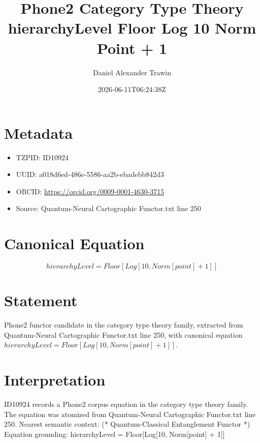 \documentclass[11pt]{article}
\title{Phone2 Category Type Theory hierarchyLevel Floor Log 10 Norm Point + 1}
\author{Daniel Alexander Trawin}
\date{2026-06-11T06:24:38Z}
\begin{document}
\maketitle
\section*{Metadata}
\begin{itemize}
\item TZPID: ID10924
\item UUID: a018d6ed-486e-5586-aa2b-ebadebb842d3
\item ORCID: \url{https://orcid.org/0009-0001-4630-3715}
\item Source: Quantum-Neural Cartographic Functor.txt line 250
\end{itemize}
\section*{Canonical Equation}
\[
hierarchyLevel = Floor[Log[10, Norm[point] + 1]]
\]
\section*{Statement}
Phone2 functor candidate in the category type theory family, extracted from Quantum-Neural Cartographic Functor.txt line 250, with canonical equation $hierarchyLevel = Floor[Log[10, Norm[point] + 1]]$.
\section*{Interpretation}
ID10924 records a Phone2 corpus equation in the category type theory family. The equation was atomized from Quantum-Neural Cartographic Functor.txt line 250. Nearest semantic context: (* Quantum-Classical Entanglement Functor *) Equation grounding: hierarchyLevel = Floor[Log[10, Norm[point] + 1]]
\end{document}
